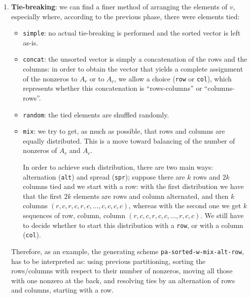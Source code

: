 \begin{enumerate}
 \item \textbf{Tie-breaking}: we can find a finer method of arranging the elements of $v$, especially where, according to the previous phase, there were elements tied:
 
 \begin{itemize}
  \item \verb|simple|: no actual tie-breaking is performed and the sorted vector is left as-is.
  \item \verb|concat|: the unsorted vector is simply a concatenation of the rows and the columns: in order to obtain the vector that yields a complete assignment of the nonzeros to $A_r$ or to $A_c$, we allow a choice (\verb|row| or \verb|col|), which represents whether this concatenation is ``rows-columns'' or ``columns-rows''. 
  
  \item \verb|random|: the tied elements are shuffled randomly.
  \item \verb|mix|: we try to get, as much as possible, that rows and columns are equally distributed. This is a move toward balancing of the number of nonzeros of $A_r$ and $A_c$. 
  
  In order to achieve such distribution, there are two main ways: alternation (\verb|alt|) and spread (\verb|spr|); suppose there are $k$ rows and $2k$ columns tied and we start with a row: with the first distribution we have that the first $2k$ elements are rows and column alternated, and then $k$ columns $(r,c,r,c,r,c,\dots,c,c,c,c)$, whereas with the second one we get $k$ sequences of row, column, column $(r,c,c,r,c,c,\dots,r,c,c)$. We still have to decide whether to start this distribution with a \verb|row|, or with a column (\verb|col|).
 \end{itemize}

Therefore, as an example, the generating scheme \verb|pa-sorted-w-mix-alt-row|, has to be interpreted as: using previous partitioning, sorting the rows/columns with respect to their number of nonzeros, moving all those with one nonzero at the back, and resolving ties by an alternation of rows and columns, starting with a row.
 
\end{enumerate}

